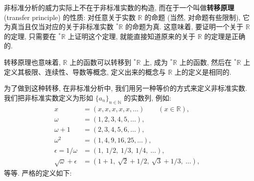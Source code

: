 
非标准分析的威力实际上不在于非标准实数的构造,
而在于一个叫做\textbf{转移原理} (transfer principle) 的性质:
对任意关于实数 $\mathbb{R}$ 的命题 (当然, 对命题有些限制),
它为真当且仅当对应的关于非标准实数 $^* \mathbb{R}$ 的命题为真.
这意味着, 要证明一个关于 $\mathbb{R}$ 的定理,
只需要在 $^* \mathbb{R}$ 上证明这个定理,
就能直接知道原来的关于 $\mathbb{R}$ 的定理是正确的.

转移原理也意味着,
$\mathbb{R}$ 上的函数可以转移到 $^* \mathbb{R}$ 上,
成为 $^* \mathbb{R}$ 上的函数,
然后在 $^* \mathbb{R}$ 上定义其极限、连续性、导数等概念,
定义出来的概念与 $\mathbb{R}$ 上的定义是相同的.

为了做到这种转移,
在非标准分析中,
我们用另一种等价的方式来定义非标准实数.
我们把非标准实数定义为形如 $\{ a_n \}_{n \in \mathbb{N}}$ 的实数列, 例如:
\begin{align*}
    x &= (x, x, x, x, x, \dotsc) \qquad (x \in \mathbb{R}), \\
    \omega &= (1, 2, 3, 4, 5, \dotsc), \\
    \omega + 1 &= (2, 3, 4, 5, 6, \dotsc), \\
    \omega^2 &= (1, 4, 9, 16, 25, \dotsc), \\
    \epsilon = 1/\omega &= (1, \ 1/2, \ 1/3, \ 1/4, \ \dotsc), \\
    \sqrt{\omega} + \epsilon &= (1 + 1, \ \sqrt{2} + 1/2, \ \sqrt{3} + 1/3, \ \dotsc),
\end{align*}
等等. 严格的定义如下:


